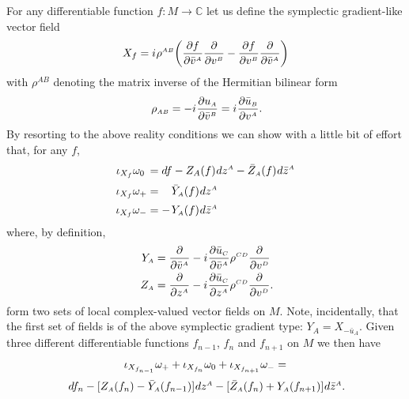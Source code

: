 \documentclass[11pt]{amsart}
\theoremstyle{remark}
\theoremstyle{remark}
\theoremstyle{definition}
\theoremstyle{definition}
\theoremstyle{definition}
\newcommand{\0}{{\scriptstyle 0'}} %
\newcommand{\1}{{\scriptstyle 1'}}
\newcommand{\A}{{\scriptscriptstyle A}} %
\newcommand{\B}{{\scriptscriptstyle B}}
\newcommand{\C}{{\scriptscriptstyle C}}
\newcommand{\D}{{\scriptscriptstyle D}}
\newcommand{\pt}{\hspace{1pt}} %
\newcommand{\hp}{\hspace{0.5pt}} %
\begin{document}
For any differentiable function \mbox{$f: M \rightarrow \mathbb{C}$} let us define the symplectic gradient-like vector field 
\begin{equation} \label{X_f_1}
X_f = i \hp \rho^{\A\B} \bigg( \frac{\partial f}{\partial \bar{v}^{\A}} \frac{\partial }{\partial v^{\B}} - \frac{\partial f}{\partial v^{\B}} \frac{\partial }{\partial \bar{v}^{\A}} \bigg)
\end{equation}
with $\rho^{\A\B}$ denoting the matrix inverse of the Hermitian bilinear form
\begin{equation}
\rho_{\A\B} = - i \hp \frac{\partial u_{\A}}{\partial \bar{v}^{\B}} = i \hp \frac{\partial \bar{u}_{\B}}{\partial v^{\A}} \rlap{.}
\end{equation}
By resorting to the above reality conditions we can show with a little bit of effort that, for any $f$,
{\allowdisplaybreaks
\begin{equation} \label{sym_f}
\begin{aligned}
\iota_{X_f} \omega_0 \hspace{2pt} & = df - Z_{A}(f) \hp dz^{\A} - \bar{Z}_{\A}(f) \hp d\bar{z}^{\A} \\[2pt]
\iota_{X_f} \omega_+ & = \phantom{+} \pt \bar{Y}_{\A}(f) \hp dz^{\A} \\[2pt]
\iota_{X_f} \omega_- & = - \pt Y_{\A}(f) \hp d\bar{z}^{\A}
\end{aligned}
\end{equation}
}%
where, by definition, 
{\allowdisplaybreaks
\begin{equation} \label{YZ_1}
\begin{aligned}
Y_{\A} & = \frac{\partial }{\partial \bar{v}^{\A}} - i \hp \frac{\partial \bar{u}_{\C}}{\partial \bar{v}^{\A}} \rho^{\C\D} \frac{\partial}{\partial v^{\D}} \\
Z_{\A} & = \frac{\partial }{\partial z^{\A}} - i \hp \frac{\partial \bar{u}_{\C}}{\partial z^{\A}} \rho^{\C\D} \frac{\partial}{\partial v^{\D}} \rlap{.}
\end{aligned}
\end{equation}
}%
form two sets of local complex-valued vector fields on $M$. Note, incidentally, that the first set of fields is of the above symplectic gradient type: $Y_{\A} = X_{-\bar{u}_{\A}}$. Given three different differentiable functions $f_{n-1}$, $f_n$ and $f_{n+1}$ on $M$ we then have 
\begin{gather} \label{tripl_grad}
\iota_{X_{f_{n-1}}}\omega_+ + \iota_{X_{f_n}}\omega_0 + \iota_{X_{f_{n+1}}}\omega_-  = \\[2pt]
df_n - [Z_{\A}(f_n) - \bar{Y}_{\A}(f_{n-1})] \hp dz^{\A} - [\bar{Z}_{\A}(f_n) + Y_{\A}(f_{n+1})] \hp d\bar{z}^{\A} \rlap{.} \nonumber
\end{gather}
\end{document}

